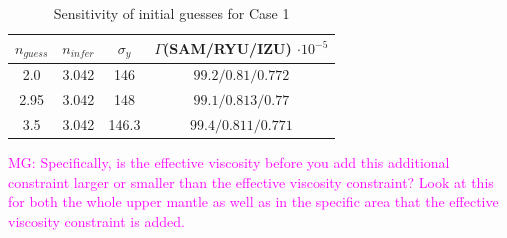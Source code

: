 \documentclass[12pt]{article}
\newcommand{\mgnote}[1]{\textcolor{magenta}{MG: #1}}
\begin{document}
{\begin{table}[H]
		\caption{Sensitivity of initial guesses for Case 1} %
		\centering  %
		\begin{tabular}{ c c c c } %
		\hline \hline                        %
		 $n_{guess}$ &$n_{infer}$ &$\sigma_y$&$\Gamma $(SAM/RYU/IZU) $\cdot 10^{-5}$   \\ [0.5ex] %
		\hline                  %
        	 2.0 &3.042 & 146 & $99.2/0.81/0.772$   \\
	         2.95 &3.042 & 148 & $99.1/0.813/0.77$    \\
	        3.5 &3.042 & 146.3 & $99.4/0.811/0.771$  \\             
                \hline %
		\end{tabular}
		\label{table:initial_guess} %
		\end{table}
\mgnote{Specifically, is the effective viscosity before you add this additional constraint larger or smaller than the effective viscosity constraint? Look at this for both the whole upper mantle as well as in the specific area that the effective viscosity constraint is added.}



 



}
\end{document}
